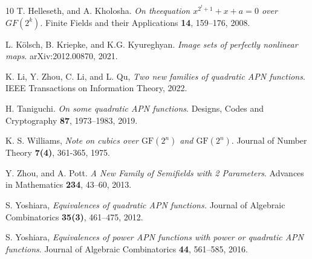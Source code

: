 \documentclass{article}
\begin{document}
\begin{thebibliography}{10}
 T. Helleseth, and A. Kholosha. \textit{On theequation $x^{2^l+1}+x+a=0$ over $GF(2^k)$}. Finite Fields and their Applications  \textbf{14}, 159--176, 2008.

 L. K\"{o}lsch, B. Kriepke, and K.G. Kyureghyan. \textit{Image sets of perfectly nonlinear maps}. arXiv:2012.00870, 2021.

 K. Li, Y. Zhou, C. Li, and L. Qu, \textit{Two new families of quadratic APN functions}. IEEE Transactions on Information Theory, 2022.


 H. Taniguchi. \textit{On some quadratic APN functions}.  {Designs, Codes and Cryptography} \textbf{87}, 1973--1983, 2019.

  K. S. Williams, \textit{Note on cubics over $\mathrm{GF}(2^n)$ and $\mathrm{GF}(2^n)$}.  {Journal of Number Theory} \textbf{7(4)},  361-365, 1975.


Y. Zhou, and A. Pott.  \textit{A New Family of Semifields with 2 Parameters}. {Advances in Mathematics} \textbf{234}, 43--60, 2013.





 S. Yoshiara,  \textit{ Equivalences of quadratic APN functions.} Journal of Algebraic Combinatorics \textbf{35(3)}, 461--475, 2012.

 S. Yoshiara, \textit{ Equivalences of power APN functions with power or quadratic APN functions}. Journal of Algebraic Combinatorics \textbf{44}, 561--585, 2016.


\end{thebibliography}
\end{document}
